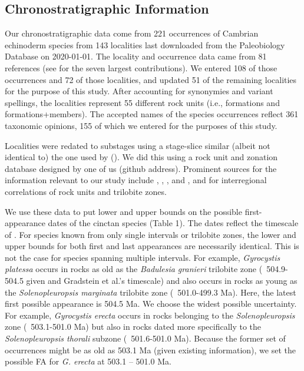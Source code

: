 \documentclass{article}
\begin{document}
\subsection{Chronostratigraphic Information}
Our chronostratigraphic data come from 221 occurrences of Cambrian echinoderm species from 143 localities last downloaded from the Paleobiology Database on 2020-01-01.  The locality and occurrence data came from 81 references (see \cite{Nardin2017, Zamora2009, Chlupac1998, Sprinkle2006, Termier1973, Sprinkle1973} for the seven largest contributions). We entered 108 of those occurrences and 72 of those localities, and updated 51 of the remaining localities for the purpose of this study.  After accounting for synonymies and variant spellings, the localities represent 55 different rock units (i.e., formations and formations+members).  The accepted names of the species occurrences reflect 361 taxonomic opinions, 155 of which we entered for the purposes of this study.

Localities were redated to substages using a stage-slice similar (albeit not identical to) the one used by (\citep{Rasmussen2019}). We did this using a rock unit and zonation database designed by one of us (github address). Prominent sources for the information relevant to our study include \citep{Álvaro2001}, \citep{Liñán2004}, \citep{Geyer2006}, and \citep{Geyer2000}, \citep{Álvaro2007} and \citep{Geyer2019} for interregional correlations of rock units and trilobite zones.

We use these data to put lower and upper bounds on the possible first-appearance dates of the cinctan species (Table 1).  The dates reflect the timescale of \citep{Gradstein2012}. For species known from only single intervals or trilobite zones, the lower and upper bounds for both first and last appearances are necessarily identical.  This is not the case for species spanning multiple intervals. For example, \textit{Gyrocystis platessa} occurs in rocks as old as the \textit{Badulesia granieri} trilobite zone (~504.9-504.5 given \citep{Geyer2019} and Gradstein et al.’s timescale) and also occurs in rocks as young as the \textit{Solenopleuropsis marginata} trilobite zone (~501.0-499.3 Ma).  Here, the latest first possible appearance is 504.5 Ma.  We choose the widest possible uncertainty.  For example, \textit{Gyrocystis erecta} occurs in rocks belonging to the \textit{Solenopleuropsis} zone (~503.1-501.0 Ma) but also in rocks dated more specifically to the \textit{Solenopleuropsis thorali} subzone (~501.6-501.0 Ma).  Because the former set of occurrences might be as old as 503.1 Ma (given existing information), we set the possible FA for \textit{G. erecta} at 503.1 – 501.0 Ma.
\end{document}
